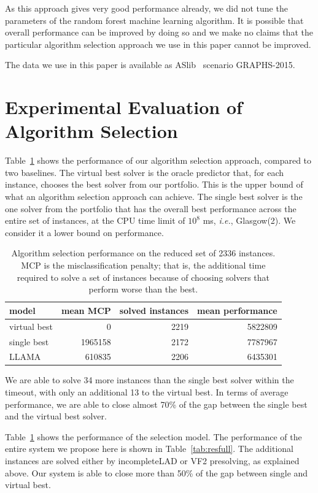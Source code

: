 \documentclass{llncs}
\begin{document}
As this approach gives very good performance already, we did not tune the
parameters of the random forest machine learning algorithm. It is possible that
overall performance can be improved by doing so and we make no claims that the
particular algorithm selection approach we use in this paper cannot be improved.

The data we use in this paper is available as ASlib~\cite{aslib} scenario
GRAPHS-2015.


\section{Experimental Evaluation of Algorithm Selection}

Table~\ref{tab:res} shows the performance of our algorithm selection approach, compared to two
baselines. The virtual best solver is the oracle predictor that, for each instance, chooses the best
solver from our portfolio. This is the upper bound of what an algorithm selection approach can
achieve. The single best solver is the one solver from the portfolio that has the overall best
performance across the entire set of instances, at the CPU time limit of $10^8$ ms, {\em i.e.}, Glasgow(2). We consider it a lower bound on performance.

\begin{table}[ht]
\centering
\begin{tabular}{lrrr}
  \toprule
model & mean MCP & solved instances & mean performance\\
  \midrule
virtual best & 0 & 2219 & 5822809\\
single best & 1965158 & 2172 & 7787967\\
LLAMA & 610835 & 2206 & 6435301\\
   \bottomrule
\end{tabular}
\vspace{1ex}
\caption{Algorithm selection performance on the reduced set of 2336
instances. MCP is the misclassification penalty; that is, the additional time
required to solve a set of instances because of choosing solvers that perform
worse than the best.}\label{tab:res} \end{table}

We are able to solve 34 more instances than the single best solver within the
timeout, with only an additional 13 to the virtual best. In terms of average
performance, we are able to close almost 70\% of the gap between the single best
and the virtual best solver.

Table~\ref{tab:res} shows the performance of the selection model. The
performance of the entire system we propose here is shown in
Table~\ref{tab:resfull}. The additional instances are solved either by
incompleteLAD or VF2 presolving, as explained above. Our system is able to close
more than 50\% of the gap between single and virtual best.
\end{document}
